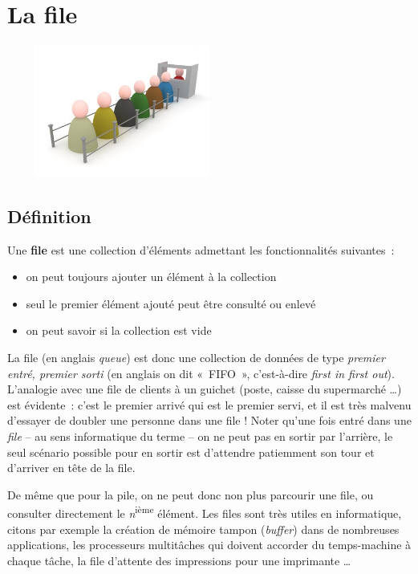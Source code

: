\chapter{La file}

\begin{center}
	\includegraphics[width=7.553cm,height=4.357cm]{image/a2012Logique2eme-img013.jpg}
\end{center}
	

\section{Définition}
	
	Une \textbf{file} est une collection d'éléments 
	admettant les fonctionnalités suivantes~:

	\begin{itemize}
		\item {
			on peut toujours ajouter un élément à la collection}
		\item {
			seul le premier élément ajouté peut être consulté ou enlevé}
		\item {
			on peut savoir si la collection est vide}
	\end{itemize}

	La file (en anglais \textit{queue}) est donc une collection 
	de données de type \textit{premier entré, premier sorti} 
	(en anglais on dit «~FIFO~», c'est-à-dire \textit{first in first out}). 
	L'analogie avec une file de clients à un guichet (poste, caisse du 
	supermarché {\dots}) est évidente~: c'est le premier arrivé qui est 
	le premier servi, et il est très malvenu d'essayer de doubler une personne 
	dans une file ! Noter qu'une fois entré dans une \textit{file} -- au
	sens informatique du terme -- on ne peut pas en sortir par l'arrière, 
	le seul scénario possible pour en sortir est
	d'attendre patiemment son tour et d'arriver en tête de la file.

	De même que pour la pile, on ne peut donc non plus parcourir une 
	file, ou consulter directement le \textit{n}\textsuperscript{ième}
	élément. Les files sont très utiles en informatique, citons par 
	exemple la création de mémoire tampon (\textit{buffer})
	dans de nombreuses applications, les processeurs multitâches 
	qui doivent accorder du temps-machine à chaque tâche, la
	file d'attente des impressions pour une imprimante {\dots}


